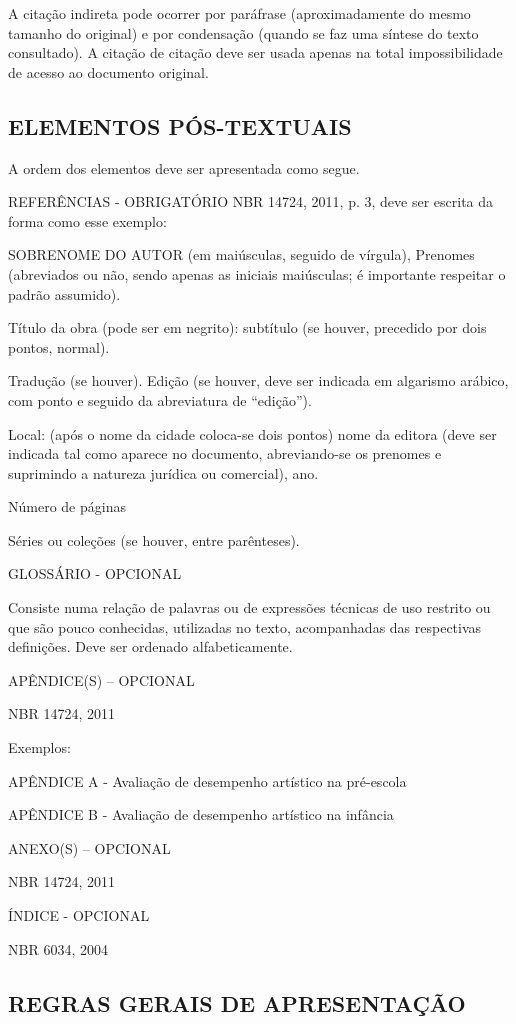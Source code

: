 A citação indireta pode ocorrer por paráfrase (aproximadamente do mesmo tamanho do original) e por condensação (quando se faz uma
síntese do texto consultado). A citação de citação deve ser usada apenas na total impossibilidade de acesso ao documento original.

\subsection{ELEMENTOS PÓS-TEXTUAIS}
A ordem dos elementos deve ser apresentada como segue. 

REFERÊNCIAS - OBRIGATÓRIO
NBR 14724, 2011, p. 3, deve ser escrita da forma como esse exemplo:

SOBRENOME DO AUTOR (em maiúsculas, seguido de vírgula), Prenomes (abreviados ou não, sendo apenas as iniciais maiúsculas; é importante respeitar o padrão assumido).

Título
da obra (pode ser em negrito): subtítulo (se houver, precedido por dois pontos, normal).

Tradução (se houver). Edição (se houver, deve ser indicada em algarismo arábico, com ponto e seguido da abreviatura de “edição”).

Local: (após o nome da cidade coloca-se dois pontos) nome da editora (deve ser indicada tal como aparece no documento, abreviando-se os
prenomes e suprimindo a natureza jurídica ou comercial), ano.

Número de páginas

Séries ou coleções (se houver, entre parênteses). 

GLOSSÁRIO - OPCIONAL 

Consiste numa relação de palavras ou de expressões técnicas de uso restrito ou que são pouco conhecidas, utilizadas no texto, acompanhadas das respectivas definições. Deve ser ordenado alfabeticamente.

APÊNDICE(S) – OPCIONAL

NBR 14724, 2011

Exemplos:

APÊNDICE A - Avaliação de desempenho artístico na pré-escola

APÊNDICE B - Avaliação de desempenho artístico na infância 

ANEXO(S) – OPCIONAL

NBR 14724, 2011

ÍNDICE - OPCIONAL

NBR 6034, 2004

\subsection{REGRAS GERAIS DE APRESENTAÇÃO }

